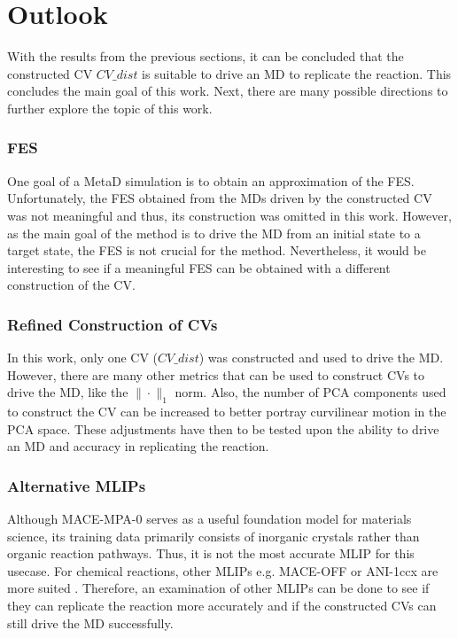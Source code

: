 \chapter{Outlook}\label{ch: ch6}%
With the results from the previous sections, it can be concluded that the constructed CV $CV\_dist$ is suitable to drive an MD to replicate the reaction.
This concludes the main goal of this work.
Next, there are many possible directions to further explore the topic of this work.

\subsection{FES}
One goal of a MetaD simulation is to obtain an approximation of the FES. 
Unfortunately, the FES obtained from the MDs driven by the constructed CV was not meaningful and thus, its construction was omitted in this work.
However, as the main goal of the method is to drive the MD from an initial state to a target state, the FES is not crucial for the method.
Nevertheless, it would be interesting to see if a meaningful FES can be obtained with a different construction of the CV.

\subsection{Refined Construction of CVs}
In this work, only one CV ($CV\_dist$) was constructed and used to drive the MD.
However, there are many other metrics that can be used to construct CVs to drive the MD, like the $\| \cdot \|_1$ norm.
Also, the number of PCA components used to construct the CV can be increased to better portray curvilinear motion in the PCA space. 
These adjustments have then to be tested upon the ability to drive an MD and accuracy in replicating the reaction.

\subsection{Alternative MLIPs}
Although MACE-MPA-0 serves as a useful foundation model for materials science, its training data primarily consists of inorganic crystals rather than organic reaction pathways.
Thus, it is not the most accurate MLIP for this usecase. For chemical reactions, other MLIPs e.g. MACE-OFF or ANI-1ccx are more suited \cite{Jacobs2025}.
Therefore, an examination of other MLIPs can be done to see if they can replicate the reaction more accurately and if the constructed CVs can still drive the MD successfully.

